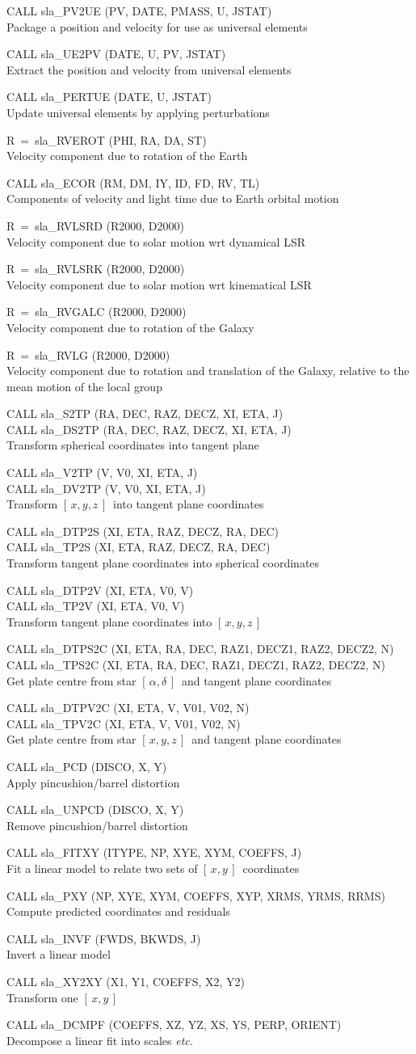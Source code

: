 \documentclass[11pt,twoside,nolof]{starlink}
\providecommand{\radec}     {$[\,\alpha,\delta\,]$}
\providecommand{\xy}        {$[\,x,y\,]$}
\providecommand{\xyz}       {$[\,x,y,z\,]$}
\providecommand{\callhead}[1]{\goodbreak\vspace{\bigskipamount}{\large\bf{#1}}}
\newenvironment{callset}{\begin{list}{}{\setlength{\leftmargin}{2cm}
                             \setlength{\parsep}{\smallskipamount}}}{\end{list}}
\providecommand{\subp}[1]{\item\hspace{-1cm}#1\\}
\providecommand{\subq}[2]{\item\hspace{-1cm}#1\\\hspace*{-1cm}#2\\}
\begin{document}
\begin{callset}
\subp{CALL sla\_PV2UE (PV, DATE, PMASS, U, JSTAT)}
   Package a position and velocity for use as universal elements
\subp{CALL sla\_UE2PV (DATE, U, PV, JSTAT)}
   Extract the position and velocity from universal elements
\subp{CALL sla\_PERTUE (DATE, U, JSTAT)}
   Update universal elements by applying perturbations
\subp{R~=~sla\_RVEROT (PHI, RA, DA, ST)}
   Velocity component due to rotation of the Earth
\subp{CALL sla\_ECOR (RM, DM, IY, ID, FD, RV, TL)}
   Components of velocity and light time due to Earth orbital motion
\subp{R~=~sla\_RVLSRD (R2000, D2000)}
   Velocity component due to solar motion wrt dynamical LSR
\subp{R~=~sla\_RVLSRK (R2000, D2000)}
   Velocity component due to solar motion wrt kinematical LSR
\subp{R~=~sla\_RVGALC (R2000, D2000)}
   Velocity component due to rotation of the Galaxy
\subp{R~=~sla\_RVLG (R2000, D2000)}
   Velocity component due to rotation and translation of the
   Galaxy, relative to the mean motion of the local group
\end{callset}

\callhead{Astrometry}
\begin{callset}
\subq{CALL sla\_S2TP (RA, DEC, RAZ, DECZ, XI, ETA, J)}
     {CALL sla\_DS2TP (RA, DEC, RAZ, DECZ, XI, ETA, J)}
   Transform spherical coordinates into tangent plane
\subq{CALL sla\_V2TP (V, V0, XI, ETA, J)}
     {CALL sla\_DV2TP (V, V0, XI, ETA, J)}
   Transform \xyz\ into tangent plane coordinates
\subq{CALL sla\_DTP2S (XI, ETA, RAZ, DECZ, RA, DEC)}
     {CALL sla\_TP2S (XI, ETA, RAZ, DECZ, RA, DEC)}
   Transform tangent plane coordinates into spherical coordinates
\subq{CALL sla\_DTP2V (XI, ETA, V0, V)}
     {CALL sla\_TP2V (XI, ETA, V0, V)}
   Transform tangent plane coordinates into \xyz
\subq{CALL sla\_DTPS2C (XI, ETA, RA, DEC, RAZ1, DECZ1, RAZ2, DECZ2, N)}
     {CALL sla\_TPS2C (XI, ETA, RA, DEC, RAZ1, DECZ1, RAZ2, DECZ2, N)}
   Get plate centre from star \radec\ and tangent plane coordinates
\subq{CALL sla\_DTPV2C (XI, ETA, V, V01, V02, N)}
     {CALL sla\_TPV2C (XI, ETA, V, V01, V02, N)}
   Get plate centre from star \xyz\ and tangent plane coordinates
\subp{CALL sla\_PCD (DISCO, X, Y)}
   Apply pincushion/barrel distortion
\subp{CALL sla\_UNPCD (DISCO, X, Y)}
   Remove pincushion/barrel distortion
\subp{CALL sla\_FITXY (ITYPE, NP, XYE, XYM, COEFFS, J)}
   Fit a linear model to relate two sets of \xy\ coordinates
\subp{CALL sla\_PXY (NP, XYE, XYM, COEFFS, XYP, XRMS, YRMS, RRMS)}
   Compute predicted coordinates and residuals
\subp{CALL sla\_INVF (FWDS, BKWDS, J)}
   Invert a linear model
\subp{CALL sla\_XY2XY (X1, Y1, COEFFS, X2, Y2)}
   Transform one \xy
\subp{CALL sla\_DCMPF (COEFFS, XZ, YZ, XS, YS, PERP, ORIENT)}
   Decompose a linear fit into scales \textit{etc.}
\end{callset}
\end{document}
